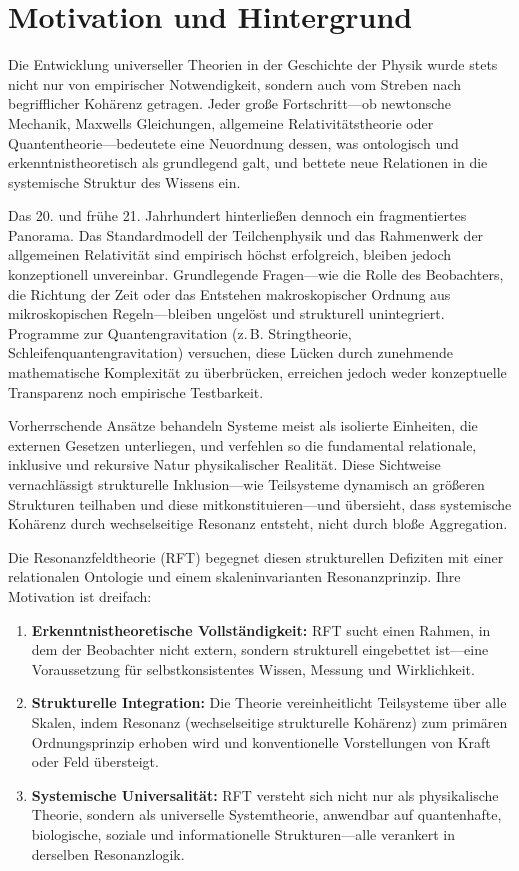 \documentclass[12pt]{article}
\begin{document}
\section{Motivation und Hintergrund}

Die Entwicklung universeller Theorien in der Geschichte der Physik wurde stets nicht nur von empirischer Notwendigkeit, sondern auch vom Streben nach begrifflicher Kohärenz getragen. Jeder große Fortschritt—ob newtonsche Mechanik, Maxwells Gleichungen, allgemeine Relativitätstheorie oder Quantentheorie—bedeutete eine Neuordnung dessen, was ontologisch und erkenntnistheoretisch als grundlegend galt, und bettete neue Relationen in die systemische Struktur des Wissens ein.

Das 20. und frühe 21. Jahrhundert hinterließen dennoch ein fragmentiertes Panorama. Das Standardmodell der Teilchenphysik und das Rahmenwerk der allgemeinen Relativität sind empirisch höchst erfolgreich, bleiben jedoch konzeptionell unvereinbar. Grundlegende Fragen—wie die Rolle des Beobachters, die Richtung der Zeit oder das Entstehen makroskopischer Ordnung aus mikroskopischen Regeln—bleiben ungelöst und strukturell unintegriert. Programme zur Quantengravitation (z. B. Stringtheorie, Schleifenquantengravitation) versuchen, diese Lücken durch zunehmende mathematische Komplexität zu überbrücken, erreichen jedoch weder konzeptuelle Transparenz noch empirische Testbarkeit.

Vorherrschende Ansätze behandeln Systeme meist als isolierte Einheiten, die externen Gesetzen unterliegen, und verfehlen so die fundamental relationale, inklusive und rekursive Natur physikalischer Realität. Diese Sichtweise vernachlässigt strukturelle Inklusion—wie Teilsysteme dynamisch an größeren Strukturen teilhaben und diese mitkonstituieren—und übersieht, dass systemische Kohärenz durch wechselseitige Resonanz entsteht, nicht durch bloße Aggregation.

Die Resonanzfeldtheorie (RFT) begegnet diesen strukturellen Defiziten mit einer relationalen Ontologie und einem skaleninvarianten Resonanzprinzip. Ihre Motivation ist dreifach:

\begin{enumerate}
	\item \textbf{Erkenntnistheoretische Vollständigkeit:} RFT sucht einen Rahmen, in dem der Beobachter nicht extern, sondern strukturell eingebettet ist—eine Voraussetzung für selbstkonsistentes Wissen, Messung und Wirklichkeit.
	\item \textbf{Strukturelle Integration:} Die Theorie vereinheitlicht Teilsysteme über alle Skalen, indem Resonanz (wechselseitige strukturelle Kohärenz) zum primären Ordnungsprinzip erhoben wird und konventionelle Vorstellungen von Kraft oder Feld übersteigt.
	\item \textbf{Systemische Universalität:} RFT versteht sich nicht nur als physikalische Theorie, sondern als universelle Systemtheorie, anwendbar auf quantenhafte, biologische, soziale und informationelle Strukturen—alle verankert in derselben Resonanzlogik.
\end{enumerate}
\end{document}
